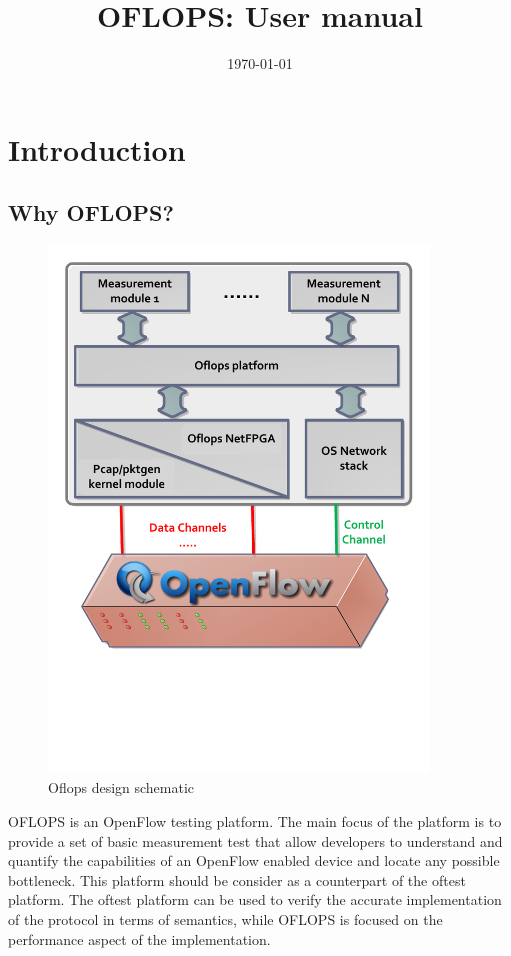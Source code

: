 \documentclass{book}
\title{OFLOPS: User manual}
\date{\today}
\begin{document}
\maketitle

\chapter{Introduction}

\section{Why OFLOPS?}

\begin{figure}[htb]
    \begin{center}
        \includegraphics[width=0.9\textwidth]{openflow-design}
    \end{center}
    \caption{Oflops design schematic}
    \label{oflops-design}
\end{figure}

OFLOPS is an OpenFlow testing platform. The main focus of the platform is 
to provide a set of basic measurement test that allow developers to understand and
quantify the capabilities of an OpenFlow enabled device and locate any
possible bottleneck. This platform should be consider as a counterpart of the
oftest platform. The oftest platform can be used to verify the accurate
implementation of the protocol in terms of semantics, while OFLOPS is focused on the
performance aspect of the implementation. 
\end{document}
